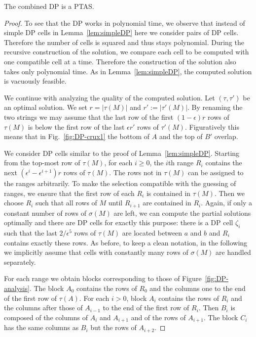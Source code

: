 \begin{theorem}\label{thm:column1}
    The combined DP is a PTAS.
\end{theorem}
\begin{proof}
    To see that the DP works in polynomial time, we observe that instead of simple DP cells in Lemma~\ref{lem:simpleDP} here we consider pairs of DP cells.
    Therefore the number of cells is squared and thus stays polynomial.
    During the recursive construction of the solution, we compare each cell to be computed with one compatible cell at a time.
    Therefore the construction of the solution also takes only polynomial time.
    As in Lemma~\ref{lem:simpleDP}, the computed solution is vacuously feasible.

    We continue with analyzing the quality of the computed solution.
    Let $(\tau,\tau')$ be an optimal solution.
    We set $r = |\tau(M)|$ and $r' := |\tau'(M)|$.
    By renaming the two strings we may assume that the last row of the first $(1-\epsilon) r$ rows of $\tau(M)$ is below the first row of the last $\epsilon r'$ rows of $\tau'(M)$.
    Figuratively this means that in Fig.~\ref{fig:DP-crux1} the bottom of $A$ and the top of $B'$ overlap.

    We consider DP cells similar to the proof of Lemma~\ref{lem:simpleDP}.
    Starting from the top-most row of $\tau(M)$, for each $i \ge 0$, the $i$th range $R_i$ contains the next 
    $(\epsilon^{i} - \epsilon^{i+1})r$ rows of $\tau(M)$.
    The rows not in $\tau(M)$ can be assigned to the ranges arbitrarily.
    To make the selection compatible with the guessing of ranges,
    we ensure that the first row of each $R_i$ is contained in $\tau(M)$. %
    Then we choose $R_i$ such that all rows of $M$ until $R_{i+1}$ are contained in $R_i$.
    Again, if only a constant number of rows of $\sigma(M)$ are left, we can compute the partial solutions optimally and
    there are DP cells for exactly this purpose:
    there is a DP cell $\zeta_i$ such that the last $2/\epsilon^5$ rows of $\tau(M)$ are located between $a$ and $b$ and $R_i$ contains exactly these rows.
    As before, to keep a clean notation, in the following we implicitly assume that cells with constantly many rows of $\sigma(M)$ are handled separately.

    For each range we obtain blocks corresponding to those of Figure~\ref{fig:DP-analysis}.
    The block $A_0$ contains the rows of $R_0$ and the columns one to the end of the first row of $\tau(A)$.
    For each $i > 0$, block $A_i$ contains the rows of $R_i$ and the columns after those of $A_{i-1}$ to the end of the first row of $R_i$.
    Then $B_i$ is composed of the columns of $A_i$ and $A_{i+1}$ and of the rows of $A_{i+1}$.
    The block $C_i$ has the same columns as $B_i$ but the rows of $A_{i+2}$.
    

\end{proof}
